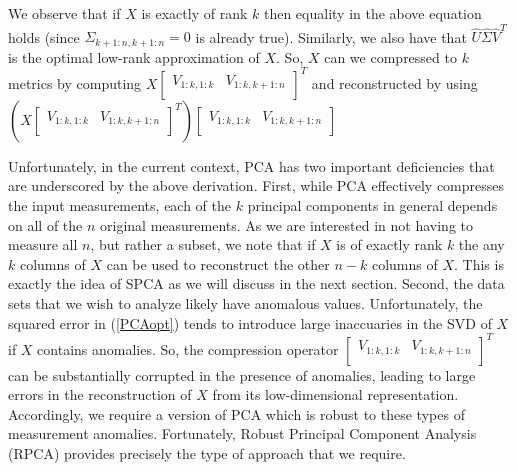 \documentclass[conference]{IEEEtran}
\begin{document}
We observe that if $X$ is exactly of rank $k$ then equality in the above equation holds (since $\Sigma_{k+1:n,k+1:n}=0$ is already true).  Similarly, we also have that $\hat{U} \hat{\Sigma} \hat{V}^T$ is the optimal low-rank approximation of $X$.  So, $X$ can we compressed to $k$ metrics by computing $X \begin{bmatrix} V_{1:k,1:k} & V_{1:k,k+1:n} \\ \end{bmatrix}^T$ and reconstructed by using $(X \begin{bmatrix} V_{1:k,1:k} & V_{1:k,k+1:n} \\ \end{bmatrix}^T) \begin{bmatrix} V_{1:k,1:k} & V_{1:k,k+1:n} \\ \end{bmatrix}$

Unfortunately, in the current context, PCA has two important deficiencies that are underscored by the above derivation.  First, while PCA effectively compresses the input measurements, each of the $k$ principal components in general depends on all of the $n$ original measurements.   As we are interested in not having to measure all $n$, but rather a subset, we note that if $X$ is of exactly rank $k$ the any $k$ columns of $X$ can be used to reconstruct the other $n-k$ columns of $X$.  This is exactly the idea of SPCA as we will discuss in the next section.
Second, the data sets that we wish to analyze likely have anomalous values.  Unfortunately, the squared error in (\ref{PCAopt}) tends to introduce large inaccuaries in the SVD of $X$ if $X$ contains anomalies.  So, the compression operator $\begin{bmatrix} V_{1:k,1:k} & V_{1:k,k+1:n} \\ \end{bmatrix}^T$ can be substantially corrupted in the presence of anomalies, leading to large errors in the reconstruction of $X$ from its low-dimensional representation.
Accordingly, we require a version of PCA which is robust to these types of measurement anomalies.   Fortunately, Robust Principal Component Analysis (RPCA) \cite{Candes2009,
 Candes2011, Chandrasekaran2009, Cai2010, Paffenroth2012a,Paffenroth2013b} provides precisely the type of approach that we require.   
\end{document}
